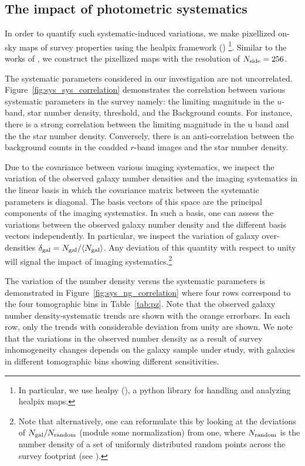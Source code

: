 \documentclass[fleqn,usenatbib,useAMS]{mnras}
\begin{document}
\subsection{The impact of photometric systematics}

In order to quantify such systematic-induced variations, we make pixellized on-sky maps of survey properties using the healpix framework (\citealt{healpix}) \footnote{In particular, we use healpy (\citealt{healpy2019}), a python library for handling and analyzing healpix maps.}. Similar to the works of \citet{ross2017, rezaie2019}, we construct the pixellized maps with the resolution of $N_{\rm side} = 256$. 

The systematic parameters considered in our investigation are not uncorrelated. Figure~\ref{fig:sys_sys_correlation} demonstrates the correlation between various systematic parameters in the survey namely: the limiting magnitude in the $u$-band, star number density, threshold, and the Background counts. For instance, there is a strong correlation between the limiting magnitude in the u band and the the star number density. Conversely, there is an anti-correlation between the background counts in the coadded $r$-band images and the star number density.

Due to the covariance between various imaging systematics, we inspect the variation of the observed galaxy number densities and the imaging systematics in the linear basis in which the covariance matrix between the systematic parameters is diagonal. The basis vectors of this space are the principal components of the imaging systematics. In such a basis, one can assess the variations between the observed galaxy number density and the different basis vectors independently. In particular, we inspect the variation of galaxy over-densities $\delta_{\rm gal} = N_{\rm gal}/\langle N_{\rm gal} \rangle$. Any deviation of this quantity with respect to unity will signal the impact of imaging systematics.\footnote{Note that alternatively, one can reformulate this by looking at the deviations of $N_{\rm gal}/N_{\rm random}$ (module some normalization) from one, where $N_{\rm random}$ is the number density of a set of uniformly distributed random points across the survey footprint (see \citep[e.g. ][]{bautista2018sdss, icaza2020clustering}).}   

The variation of the number density versus the systematic parameters is demonstrated in Figure~\ref{fig:sys_ng_correlation} where four rows correspond to the four tomographic bins in Table~\ref{tab:pz}. Note that the observed galaxy number density-systematic trends are shown with the orange errorbars. In each row, only the trends with considerable deviation from unity are shown. We note that the variations in the observed number density as a result of survey inhomogeneity changes depends on the galaxy sample under study,  with galaxies in different tomographic bins showing different sensitivities.
\end{document}
